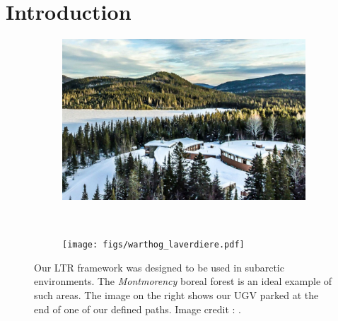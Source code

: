 \section{Introduction}
\label{sec:intro}

\lightlipsum[1]

\begin{figure} [h]
	\begin{center}
	\begin{subfigure}[b]{0.45\textwidth}
		\includegraphics[width=\linewidth]{figs/foret-montmorency.pdf}
		\label{fig:view_above}
	\end{subfigure}%
	~~
	\begin{subfigure} [b] {0.45\textwidth}
		\texttt{[image: figs/warthog\_laverdiere.pdf]}
		\label{fig:front_fig}
	\end{subfigure}
	\end{center}
	\caption{Our \ac{LTR} framework was designed to be used in subarctic environments.
	The \textit{Montmorency} boreal forest is an ideal example of such areas.
	The image on the right shows our \ac{UGV} parked at the end of one of our defined paths.
	Image credit : \foretmo.}
	\label{fig:intro}
\end{figure}

\lightlipsum[1]
\lightlipsum[1]
\lightlipsum[1]

